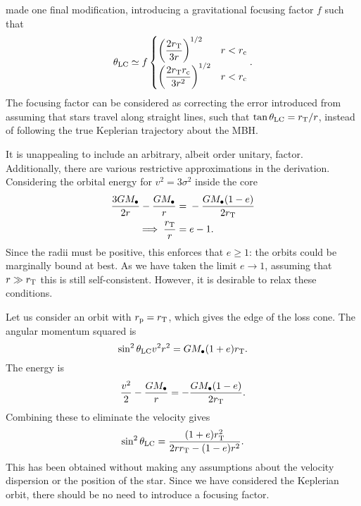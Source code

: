 \citet{Frank1976} made one final modification, introducing a gravitational focusing factor $f$ such that
\begin{align}
\theta_\mathrm{LC} \simeq f\begin{cases}\displaystyle
\displaystyle \left(\dfrac{2r_\mathrm{T}}{3r}\right)^{1/2} & r < r_\mathrm{c} \\
\displaystyle \left(\dfrac{2r_\mathrm{T}r_\mathrm{c}}{3r^2}\right)^{1/2} & r < r_\mathrm{c}
\end{cases}.
\end{align}
The focusing factor can be considered as correcting the error introduced from assuming that stars travel along straight lines, such that $\tan\theta_\mathrm{LC} = r_\mathrm{T}/r$, instead of following the true Keplerian trajectory about the MBH.

It is unappealing to include an arbitrary, albeit order unitary, factor. Additionally, there are various restrictive approximations in the derivation. Considering the orbital energy for $v^2 = 3\sigma^2$ inside the core
\begin{align}
\dfrac{3GM_\bullet}{2r} - \dfrac{GM_\bullet}{r} = {} & -\dfrac{GM_\bullet(1-e)}{2r_\mathrm{T}} \\
\implies \dfrac{r_\mathrm{T}}{r} = {} & e - 1.
\label{eq:consistency}
\end{align}
Since the radii must be positive, this enforces that $e \geq 1$: the orbits could be marginally bound at best. As we have taken the limit $e \rightarrow 1$, assuming that $r \gg r_\mathrm{T}$ this is still self-consistent. However, it is desirable to relax these conditions.

Let us consider an orbit with $r_\mathrm{p} = r_\mathrm{T}$, which gives the edge of the loss cone. The angular momentum squared is
\begin{equation}
\sin^2\theta_\mathrm{LC}v^2r^2 = GM_\bullet(1+e)r_\mathrm{T}.
\end{equation}
The energy is
\begin{equation}
\dfrac{v^2}{2} - \dfrac{GM_\bullet}{r} = -\dfrac{GM_\bullet(1-e)}{2r_\mathrm{T}}.
\end{equation}
Combining these to eliminate the velocity gives
\begin{equation}
\sin^2\theta_\mathrm{LC} = \dfrac{(1+e)r_\mathrm{T}^2}{2rr_\mathrm{T} - (1-e)r^2}.
\end{equation}
This has been obtained without making any assumptions about the velocity dispersion or the position of the star. Since we have considered the Keplerian orbit, there should be no need to introduce a focusing factor.

